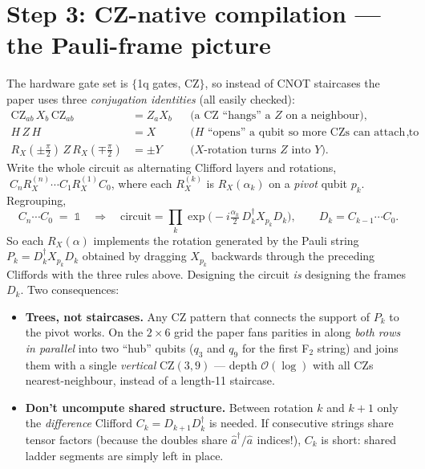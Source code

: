 \documentclass[11pt]{article}
\newcommand{\ad}[1]{\hat{a}^{\dagger}_{#1}}
\newcommand{\an}[1]{\hat{a}_{#1}}
\newcommand{\RX}{R_X}
\begin{document}
\section{Step 3: CZ-native compilation --- the Pauli-frame picture}
\label{sec:frame}
The hardware gate set is $\{$1q gates, CZ$\}$, so instead of CNOT staircases
the paper uses three \emph{conjugation identities} (all easily checked):
\begin{align}
  \mathrm{CZ}_{ab}\, X_b\, \mathrm{CZ}_{ab} &= Z_a X_b
   &&\text{(a CZ ``hangs'' a $Z$ on a neighbour)},\\
  H\, Z\, H &= X
   &&\text{($H$ ``opens'' a qubit so more CZs can attach to it)},\\
  \RX(\pm\tfrac{\pi}{2})\, Z\, \RX(\mp\tfrac{\pi}{2}) &= \pm Y
   &&\text{($X$-rotation turns $Z$ into $Y$)}.
\end{align}
Write the whole circuit as alternating Clifford layers and rotations,
$\;C_n \RX^{(n)} \cdots C_1 \RX^{(1)} C_0$, where each $\RX^{(k)}$ is
$\RX(\alpha_k)$ on a \emph{pivot} qubit $p_k$. Regrouping,
\begin{equation}
\boxed{\;
  C_n\cdots C_0 \;=\; \mathbb{1}
  \quad\Longrightarrow\quad
  \text{circuit} = \prod_{k}
  \exp\!\big(-i\tfrac{\alpha_k}{2}\, D_k^{\dagger} X_{p_k} D_k\big),
  \qquad D_k = C_{k-1}\cdots C_0 . \;}
\end{equation}
So each $\RX(\alpha)$ implements the rotation generated by the Pauli string
$P_k=D_k^{\dagger}X_{p_k}D_k$ obtained by dragging $X_{p_k}$ backwards
through the preceding Cliffords with the three rules above. Designing the
circuit \emph{is} designing the frames $D_k$. Two consequences:
\begin{itemize}
\item \textbf{Trees, not staircases.} Any CZ pattern that connects the
  support of $P_k$ to the pivot works. On the $2\times6$ grid the paper
  fans parities in along \emph{both rows in parallel} into two ``hub''
  qubits ($q_3$ and $q_9$ for the first F$_2$ string) and joins them with a
  single \emph{vertical} CZ$(3,9)$ --- depth $\mathcal{O}(\log)$ with all
  CZs nearest-neighbour, instead of a length-11 staircase.
\item \textbf{Don't uncompute shared structure.} Between rotation $k$ and
  $k{+}1$ only the \emph{difference} Clifford $C_k = D_{k+1}D_k^{\dagger}$
  is needed. If consecutive strings share tensor factors (because the
  doubles share $\ad{}/\an{}$ indices!), $C_k$ is short: shared ladder
  segments are simply left in place.
\end{itemize}
\end{document}
